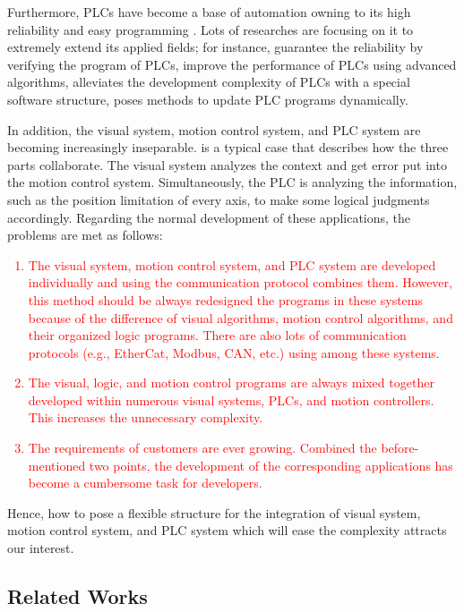 \documentclass[journal,UTF8]{IEEEtran}
\begin{document}
Furthermore, PLCs have become a base of automation owning to its high reliability and easy programming \cite{Hossain2014Advanced}. Lots of researches are focusing on it to extremely extend its applied fields; for instance, \cite{Jiang2013System,Jiang2013Bayesian} guarantee the reliability by verifying the program of PLCs, \cite{Gerk2006Advanced,Dominic2016PLC} improve the performance of PLCs using advanced algorithms, \cite{wu2018customized} alleviates the development complexity of PLCs with a special software structure, \cite{Sch2013Development} poses methods to update PLC programs dynamically.


In addition, the visual system, motion control system, and PLC system are becoming increasingly inseparable. \cite{Chen2014A} is a typical case that describes how the three parts collaborate. The visual system analyzes the context and get error put into the motion control system. Simultaneously, the PLC is analyzing the information, such as the position limitation of every axis, to make some logical judgments accordingly. Regarding the normal development of these applications, the problems are met as follows:
\textcolor{red}{ \begin{enumerate}
 	\item The visual system, motion control system, and PLC system are developed individually and using the communication protocol combines them. However, this method should be always redesigned the programs in these systems because of the difference of visual algorithms, motion control algorithms, and their organized logic programs. There are also lots of communication protocols (e.g., EtherCat, Modbus, CAN, etc.) using among these systems. 
 	\item The visual, logic, and motion control programs are always mixed together developed within numerous visual systems, PLCs, and motion controllers. This increases the unnecessary complexity. 
 	\item The requirements of customers are ever growing. Combined the before-mentioned two points, the development of the corresponding applications has become a cumbersome task for developers. 
 \end{enumerate}}

Hence, how to pose a flexible structure for the integration of visual system, motion control system, and PLC system which will ease the complexity attracts our interest.

\subsection{Related Works}
\end{document}
